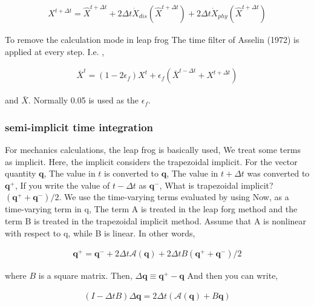 \begin{eqnarray}
  {X}^{t+\Delta t} 
    =  \hat{X}^{t+\Delta t}
    + 2 \Delta t 
      \dot{X}_{dis}\left( \hat{X}^{t+\Delta t} \right)
    + 2 \Delta t 
      \dot{X}_{phy}\left( \hat{X}^{t+\Delta t} \right)
\end{eqnarray}

To remove the calculation mode in leap frog The time filter of Asselin
(1972) is applied at every step. I.e. ,

\begin{eqnarray}
  \bar{X}^{t}
    = ( 1-2 \epsilon_f ) {X}^{t}
    +  \epsilon_f 
        \left( \bar{X}^{t-\Delta t} + {X}^{t+\Delta t} \right)
\end{eqnarray}

and \(\bar{X}\). Normally 0.05 is used as the \(\epsilon_f\).

\hypertarget{semi-implicit-time-integration}{%
\subsubsection{semi-implicit time
integration}\label{semi-implicit-time-integration}}

For mechanics calculations, the leap frog is basically used, We treat
some terms as implicit. Here, the implicit considers the trapezoidal
implicit. For the vector quantity \({\mathbf q}\), The value in \(t\) is
converted to \({\mathbf q}\), The value in \(t+\Delta t\) was converted
to \({\mathbf q}^+\), If you write the value of \(t-\Delta t\) as
\({\mathbf q}^-\), What is trapezoidal implicit?
\(({\mathbf q}^+ + {\mathbf q}^- )/2\). We use the time-varying terms
evaluated by using Now, as a time-varying term in {q}, The term A is
treated in the leap forg method and the term B is treated in the
trapezoidal implicit method. Assume that A is nonlinear with respect to
{q}, while B is linear. In other words,

\begin{eqnarray}
  {\mathbf q}^+ 
      = {\mathbf q}^- 
      + 2 \Delta t {\mathcal A}( {\mathbf q}  )
      + 2 \Delta t B (   {\mathbf q}^+ 
                       + {\mathbf q}^-   )/2
\end{eqnarray}

where \(B\) is a square matrix. Then,
\(\Delta {\mathbf q} \equiv {\mathbf q}^+ - {\mathbf q}\) And then you
can write,

\begin{eqnarray}
  ( I - \Delta t B ) \Delta {\mathbf q} 
      = 2 \Delta t \left( {\mathcal A}({\mathbf q})
                         + B {\mathbf q} \right) 
\end{eqnarray}

